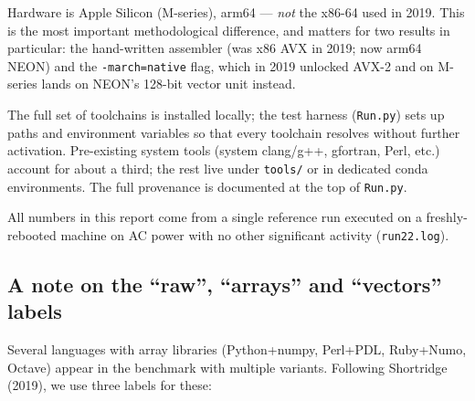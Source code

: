 \documentclass[11pt,a4paper]{article}
\begin{document}
Hardware is Apple Silicon (M-series), arm64 --- \emph{not} the x86-64
used in 2019. This is the most important methodological difference,
and matters for two results in particular: the hand-written assembler
(was x86 AVX in 2019; now arm64 NEON) and the \verb|-march=native|
flag, which in 2019 unlocked AVX-2 and on M-series lands on NEON's
128-bit vector unit instead.

The full set of toolchains is installed locally; the test harness
(\texttt{Run.py}) sets up paths and environment variables so that
every toolchain resolves without further activation. Pre-existing
system tools (system clang/g++, gfortran, Perl, etc.) account for
about a third; the rest live under \texttt{tools/} or in dedicated
conda environments. The full provenance is documented at the top of
\texttt{Run.py}.

All numbers in this report come from a single reference run executed
on a freshly-rebooted machine on AC power with no other significant
activity (\texttt{run22.log}).

\subsection*{A note on the ``raw'', ``arrays'' and ``vectors'' labels}

Several languages with array libraries (Python+numpy, Perl+PDL,
Ruby+Numo, Octave) appear in the benchmark with multiple variants.
Following Shortridge (2019), we use three labels for these:
\end{document}
